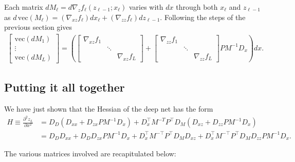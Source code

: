 \documentclass{article}
\begin{document}
Each matrix $dM_\ell = d \nabla_z f_\ell(z_{\ell-1}; x_\ell)$ varies with $dx$
through both $x_\ell$ and $z_{\ell -1}$ as $d\,\mathrm{vec} \left(M_\ell\right)
    = \left(\nabla_{xz} f_\ell\right) dx_\ell + \left(\nabla_{zz} f_\ell\right)
    dz_{\ell-1}$. Following the steps of the previous section gives
\begin{align}
    \begin{bmatrix}
        \mathrm{vec}\left(dM_1\right) \\
        \vdots                        \\
        \mathrm{vec}\left(dM_L\right)
    \end{bmatrix}
    =
    \left(
    \begin{bmatrix}
        \nabla_{xz} f_1 &        &                 \\
                        & \ddots &                 \\
                        &        & \nabla_{xz} f_L
    \end{bmatrix}
    +
    \begin{bmatrix}
        \nabla_{zz} f_1 \\ &\ddots& \\ && \nabla_{zz} f_L
    \end{bmatrix}
    P M^{-1} D_x
    \right)dx.
\end{align}

\subsection{Putting it all together}

We have just shown that the Hessian of the deep net has the form
\begin{align}
    H \equiv \frac{\partial^2 z_L}{\partial x^2}
    & = D_D \left(D_{xx} + D_{zx} PM^{-1} D_x\right) + D_x^\top M^{-T}P^\top D_M \left(D_{xz}+D_{zz}P M^{-1}D_x\right)           \\
    \label{eq:hessian}
    & = D_DD_{xx}  + D_DD_{zx} PM^{-1} D_x + D_x^\top M^{-\top}P^\top D_M D_{xz}+D_x^\top M^{-\top}P^\top D_M D_{zz}P M^{-1}D_x.
\end{align}

The various matrices involved are recapitulated below:
\end{document}
